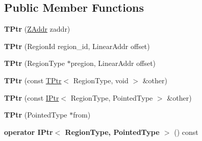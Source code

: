 \subsection*{Public Member Functions}
\begin{DoxyCompactItemize}
\item 
{\bfseries T\+Ptr} (\hyperlink{structalps_1_1ZAddr}{Z\+Addr} zaddr)\hypertarget{classalps_1_1BaseRelativePointer_1_1TPtr_a10ab6fccc1914483537708bfbdd0876b}{}\label{classalps_1_1BaseRelativePointer_1_1TPtr_a10ab6fccc1914483537708bfbdd0876b}

\item 
{\bfseries T\+Ptr} (Region\+Id region\+\_\+id, Linear\+Addr offset)\hypertarget{classalps_1_1BaseRelativePointer_1_1TPtr_a8af8b7b46e5fc2a8d0a6482531374072}{}\label{classalps_1_1BaseRelativePointer_1_1TPtr_a8af8b7b46e5fc2a8d0a6482531374072}

\item 
{\bfseries T\+Ptr} (Region\+Type $\ast$pregion, Linear\+Addr offset)\hypertarget{classalps_1_1BaseRelativePointer_1_1TPtr_af6c3c509d387efba87e5a824ab9ef54d}{}\label{classalps_1_1BaseRelativePointer_1_1TPtr_af6c3c509d387efba87e5a824ab9ef54d}

\item 
{\bfseries T\+Ptr} (const \hyperlink{classalps_1_1BaseRelativePointer_1_1TPtr}{T\+Ptr}$<$ Region\+Type, void $>$ \&other)\hypertarget{classalps_1_1BaseRelativePointer_1_1TPtr_a6a3c95e7f917ce78d53f912a116d7fdf}{}\label{classalps_1_1BaseRelativePointer_1_1TPtr_a6a3c95e7f917ce78d53f912a116d7fdf}

\item 
{\bfseries T\+Ptr} (const \hyperlink{classalps_1_1BaseRelativePointer_1_1IPtr}{I\+Ptr}$<$ Region\+Type, Pointed\+Type $>$ \&other)\hypertarget{classalps_1_1BaseRelativePointer_1_1TPtr_a7c7a365923f356bceeefc09d0238ba4e}{}\label{classalps_1_1BaseRelativePointer_1_1TPtr_a7c7a365923f356bceeefc09d0238ba4e}

\item 
{\bfseries T\+Ptr} (Pointed\+Type $\ast$from)\hypertarget{classalps_1_1BaseRelativePointer_1_1TPtr_aa1ed21917a029238fab18ed44d81ceea}{}\label{classalps_1_1BaseRelativePointer_1_1TPtr_aa1ed21917a029238fab18ed44d81ceea}

\item 
{\bfseries operator I\+Ptr$<$ Region\+Type, Pointed\+Type $>$} () const \hypertarget{classalps_1_1BaseRelativePointer_1_1TPtr_a815426f265c22440ae505346569bfee9}{}\label{classalps_1_1BaseRelativePointer_1_1TPtr_a815426f265c22440ae505346569bfee9}


\end{DoxyCompactItemize}
